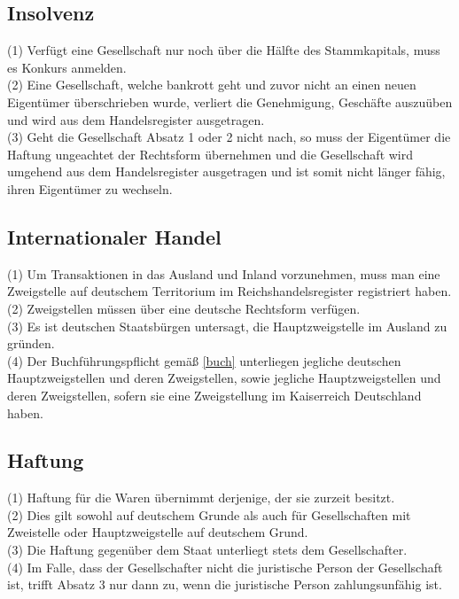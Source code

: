 \documentclass{article}
\begin{document}
\subsection{Insolvenz} \label{apored}
(1) Verfügt eine Gesellschaft nur noch über die Hälfte des Stammkapitals, muss es Konkurs anmelden.\\
(2) Eine Gesellschaft, welche bankrott geht und zuvor nicht an einen neuen Eigentümer überschrieben wurde, verliert die Genehmigung, Geschäfte auszuüben und wird aus dem Handelsregister ausgetragen.\\
(3) Geht die Gesellschaft Absatz 1 oder 2 nicht nach, so muss der Eigentümer die Haftung ungeachtet der Rechtsform übernehmen und die Gesellschaft wird umgehend aus dem Handelsregister ausgetragen und ist somit nicht länger fähig, ihren Eigentümer zu wechseln.\\

\subsection{Internationaler Handel}
(1) Um Transaktionen in das Ausland und Inland vorzunehmen, muss man eine Zweigstelle auf deutschem Territorium im Reichshandelsregister registriert haben.\\
(2) Zweigstellen müssen über eine deutsche Rechtsform verfügen.\\
(3) Es ist deutschen Staatsbürgen untersagt, die Hauptzweigstelle im Ausland zu gründen.\\
(4) Der Buchführungspflicht gemäß \ref{buch} unterliegen jegliche deutschen Hauptzweigstellen und deren Zweigstellen, sowie jegliche Hauptzweigstellen und deren Zweigstellen, sofern sie eine Zweigstellung im Kaiserreich Deutschland haben.\\

\subsection{Haftung}
(1) Haftung für die Waren übernimmt derjenige, der sie zurzeit besitzt.\\
(2) Dies gilt sowohl auf deutschem Grunde als auch für Gesellschaften mit Zweistelle oder Hauptzweigstelle auf deutschem Grund.\\
(3) Die Haftung gegenüber dem Staat unterliegt stets dem Gesellschafter.\\
(4) Im Falle, dass der Gesellschafter nicht die juristische Person der Gesellschaft ist, trifft Absatz 3 nur dann zu, wenn die juristische Person zahlungsunfähig ist.
\end{document}
